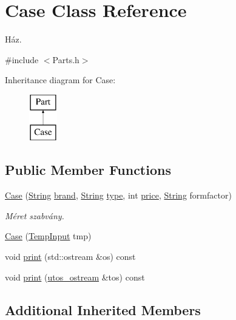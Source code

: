 \hypertarget{class_case}{}\section{Case Class Reference}
\label{class_case}


Ház.  




{\ttfamily \#include $<$Parts.\+h$>$}

Inheritance diagram for Case\+:\begin{figure}[H]
\begin{center}
\leavevmode
\includegraphics[height=2.000000cm]{class_case}
\end{center}
\end{figure}
\subsection*{Public Member Functions}
\begin{DoxyCompactItemize}
\item 
\mbox{\hyperlink{class_case_a0d953adffc664636549235d729f13260}{Case}} (\mbox{\hyperlink{class_string}{String}} \mbox{\hyperlink{class_part_ae06f2fdeb7fbbdb229a7aca151f3e341}{brand}}, \mbox{\hyperlink{class_string}{String}} \mbox{\hyperlink{class_part_a101dbcc5c4b21564df7414c7eb0eae88}{type}}, int \mbox{\hyperlink{class_part_a8e71223aed1da95a974f33d8d6c91bb1}{price}}, \mbox{\hyperlink{class_string}{String}} formfactor)
\begin{DoxyCompactList}\small\item\em Méret szabvány. \end{DoxyCompactList}\item 
\mbox{\hyperlink{class_case_a300362691710d1f9312f9d31d56ea53e}{Case}} (\mbox{\hyperlink{struct_temp_input}{Temp\+Input}} tmp)
\item 
void \mbox{\hyperlink{class_case_a9e54f42dcb7b62f1792a6475ce60aa79}{print}} (std\+::ostream \&os) const
\item 
void \mbox{\hyperlink{class_case_ae179519844b825815f4accddafae13b6}{print}} (\mbox{\hyperlink{structutos__ostream}{utos\+\_\+ostream}} \&tos) const
\end{DoxyCompactItemize}
\subsection*{Additional Inherited Members}


